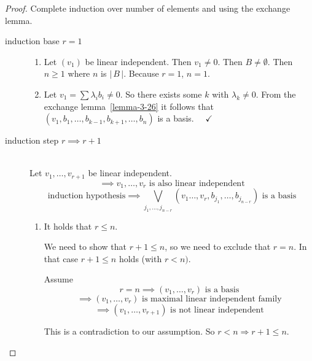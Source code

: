\documentclass[a4paper,landscape,twocolumn]{article}
\newcommand\card[1]{\left|\,#1\,\right|}
\begin{document}
\begin{proof}
  Complete induction over number of elements and using the exchange lemma.
  \begin{description}
    \item[induction base $r=1$] \hfill{}
      \begin{enumerate}
        \item
          Let $(v_1)$ be linear independent. Then $v_1 \neq 0$. Then $B \neq \emptyset$.
          Then $n \geq 1$ where $n$ is $\card{B}$.
          Because $r = 1$, $n = 1$.
        \item
          Let $v_1 = \sum \lambda_i b_i \neq 0$.
          So there exists some $k$ with $\lambda_k \neq 0$.
          From the exchange lemma~\ref{lemma-3-26} it follows
          that $(v_1, b_1, \dots, b_{k-1}, b_{k+1}, \dots, b_n)$ is a basis.
          $\quad \checkmark$
      \end{enumerate}
    \item[induction step $r \implies r+1$] \hfill{} \\
      Let $v_{1}, \dots, v_{r+1}$ be linear independent.
      \[ \implies v_1, \ldots, v_r \text{ is also linear independent} \]
      \[ \text{induction hypothesis} \implies \bigvee_{j_1, \dots, j_{n-r}} (v_1 \ldots, v_r, b_{j_1}, \dots, b_{j_{n-r}}) \text{ is a basis} \]
      \begin{enumerate}
        \item It holds that $r \leq n$.

          We need to show that $r+1 \leq n$, so we need to exclude that $r = n$.
          In that case $r + 1 \leq n$ holds (with $r < n)$.

          Assume
          \[ r = n \implies (v_1, \ldots, v_r) \text{ is a basis} \]
          \[ \implies (v_1, \dots, v_r) \text{ is maximal linear independent family} \]
          \[ \implies (v_1, \dots, v_{r + 1}) \text{ is not linear independent} \]

          This is a contradiction to our assumption.
          So $r < n \Rightarrow r+1 \leq n$.


\end{enumerate}
\end{description}
\end{proof}
\end{document}
